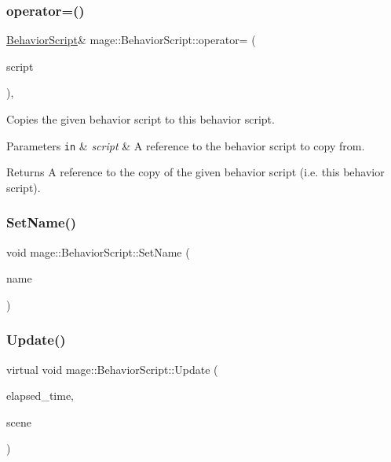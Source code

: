 \subsubsection{\texorpdfstring{operator=()}{operator=()}\hspace{0.1cm}{\footnotesize\ttfamily [2/2]}}
{\footnotesize\ttfamily \hyperlink{classmage_1_1_behavior_script}{Behavior\+Script}\& mage\+::\+Behavior\+Script\+::operator= (\begin{DoxyParamCaption}\item[{\hyperlink{classmage_1_1_behavior_script}{Behavior\+Script} \&\&}]{script }\end{DoxyParamCaption})\hspace{0.3cm}{\ttfamily [private]}, {\ttfamily [delete]}}

Copies the given behavior script to this behavior script.


\begin{DoxyParams}[1]{Parameters}
\mbox{\tt in}  & {\em script} & A reference to the behavior script to copy from. \\
\hline
\end{DoxyParams}
\begin{DoxyReturn}{Returns}
A reference to the copy of the given behavior script (i.\+e. this behavior script). 
\end{DoxyReturn}
\hypertarget{classmage_1_1_behavior_script_a04d2a39a204b9314b1f4b01ad3a93021}{}\label{classmage_1_1_behavior_script_a04d2a39a204b9314b1f4b01ad3a93021} 
\subsubsection{\texorpdfstring{Set\+Name()}{SetName()}}
{\footnotesize\ttfamily void mage\+::\+Behavior\+Script\+::\+Set\+Name (\begin{DoxyParamCaption}\item[{const string \&}]{name }\end{DoxyParamCaption})}

\hypertarget{classmage_1_1_behavior_script_ac5dcb11634d0d37957d3fe91ee4b1524}{}\label{classmage_1_1_behavior_script_ac5dcb11634d0d37957d3fe91ee4b1524} 
\subsubsection{\texorpdfstring{Update()}{Update()}}
{\footnotesize\ttfamily virtual void mage\+::\+Behavior\+Script\+::\+Update (\begin{DoxyParamCaption}\item[{double}]{elapsed\+\_\+time,  }\item[{const \hyperlink{classmage_1_1_scene}{Scene} \&}]{scene }\end{DoxyParamCaption})\hspace{0.3cm}{\ttfamily [pure virtual]}}

